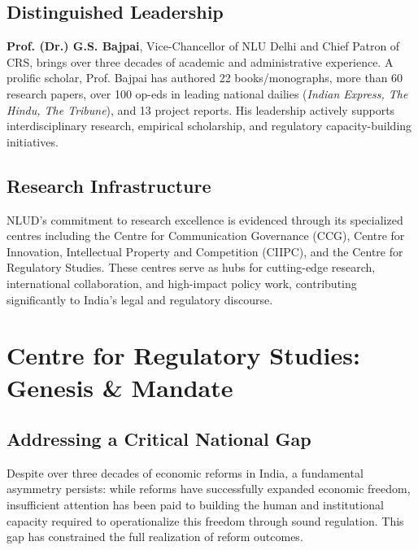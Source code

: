 \documentclass[11pt,a4paper]{article}
\begin{document}
\vspace{0.5cm}

\subsection*{Distinguished Leadership}

\textbf{Prof. (Dr.) G.S. Bajpai}, Vice-Chancellor of NLU Delhi and Chief Patron of CRS, brings over three decades of academic and administrative experience. A prolific scholar, Prof. Bajpai has authored 22 books/monographs, more than 60 research papers, over 100 op-eds in leading national dailies (\textit{Indian Express, The Hindu, The Tribune}), and 13 project reports. His leadership actively supports interdisciplinary research, empirical scholarship, and regulatory capacity-building initiatives.

\vspace{0.5cm}

\subsection*{Research Infrastructure}

NLUD's commitment to research excellence is evidenced through its specialized centres including the Centre for Communication Governance (CCG), Centre for Innovation, Intellectual Property and Competition (CIIPC), and the Centre for Regulatory Studies. These centres serve as hubs for cutting-edge research, international collaboration, and high-impact policy work, contributing significantly to India's legal and regulatory discourse.

\clearpage

\section{Centre for Regulatory Studies: Genesis \& Mandate}

\subsection*{Addressing a Critical National Gap}

Despite over three decades of economic reforms in India, a fundamental asymmetry persists: while reforms have successfully expanded economic freedom, insufficient attention has been paid to building the human and institutional capacity required to operationalize this freedom through sound regulation. This gap has constrained the full realization of reform outcomes.
\end{document}
